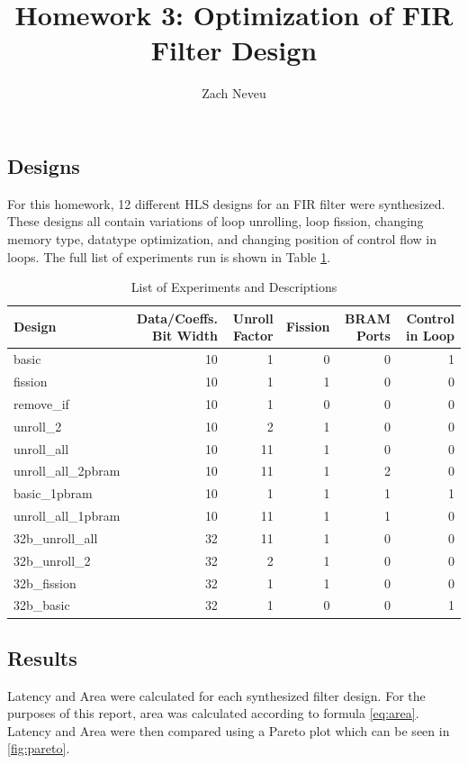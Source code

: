 \documentclass[12pt, letter]{article}
\author{Zach Neveu}
\title{ Homework 3: Optimization of FIR Filter Design }
\begin{document}
\maketitle

\subsection*{Designs}
For this homework, 12 different HLS designs for an FIR filter were synthesized. These designs all contain variations of loop unrolling, loop fission, changing memory type, datatype optimization, and changing position of control flow in loops. The full list of experiments run is shown in Table \ref{tab:experiments}.

\begin{table}[h]
	\centering
	\caption{List of Experiments and Descriptions}
	\label{tab:experiments}
	\begin{tabular}{lrrrrr}
	\toprule
	Design 				& Data/Coeffs. Bit Width  & Unroll Factor & Fission & BRAM Ports & Control in Loop \\
	\midrule
	basic				& 10 & 1 & 0 & 0 & 1 \\
	\midrule
	fission				& 10 & 1 & 1 & 0 & 0 \\
	\midrule
	remove\_if			& 10 & 1 & 0 & 0 & 0 \\
	\midrule
	unroll\_2			& 10 & 2 & 1 & 0 & 0\\
	\midrule
	unroll\_all			& 10 & 11 & 1 & 0 & 0\\
	\midrule
	unroll\_all\_2pbram	& 10 & 11 & 1 & 2 & 0\\
	\midrule
	basic\_1pbram		& 10 & 1 & 1 & 1 & 1\\
	\midrule
	unroll\_all\_1pbram	& 10 & 11 & 1 & 1 & 0\\
	\midrule
	32b\_unroll\_all	& 32 & 11 & 1 & 0 & 0\\
	\midrule
	32b\_unroll\_2		& 32 & 2 & 1 & 0 & 0\\
	\midrule
	32b\_fission		& 32 & 1 & 1 & 0 & 0\\
	\midrule
	32b\_basic			& 32 & 1 & 0 & 0 & 1\\
	\bottomrule
	\end{tabular}
\end{table}

\subsection*{Results}
Latency and Area were calculated for each synthesized filter design. For the purposes of this report, area was calculated according to formula \ref{eq:area}. Latency and Area were then compared using a Pareto plot which can be seen in \ref{fig:pareto}.
\end{document}
